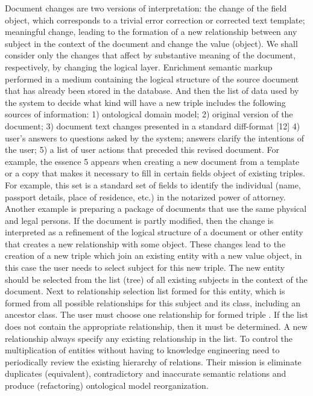 \documentclass[conference]{IEEEtran}
\begin{document}
	Document changes are two versions of interpretation: the change of the field object, which corresponds to a trivial error correction or corrected text template; meaningful change, leading to the formation of a new relationship between any subject in the context of the document and change the value (object). We shall consider only the changes that affect by substantive meaning of the document, respectively, by changing the logical layer.
	Enrichment semantic markup performed in a medium containing the logical structure of the source document that has already been stored in the database. And then the list of data used by the system to decide what kind will have a new triple includes the following sources of information:
1) ontological domain model;
2) original version of the document;
3) document text changes presented in a standard diff-format [12]
4)  user's answers to questions asked by the system; answers clarify the intentions of the user;
5) a list of user actions that preceded this revised document.
	For example, the essence 5 appears when creating a new document from a template or a copy that makes it necessary to fill in certain fields object of existing triples. For example, this set is a standard set of fields to identify the individual (name, passport details, place of residence, etc.) in the notarized power of attorney. Another example is preparing a package of documents that use the same physical and legal persons.
	If the document is partly modified, then the change is interpreted as a refinement of the logical structure of a document or other entity that creates a new relationship with some object. These changes lead to the creation of a new triple which join an existing entity with a new value object, in this case the user needs to select subject for this new triple.
	The new entity should be selected from the list (tree) of all existing subjects in the context of the document. Next to relationship selection list formed for this entity, which is formed from all possible relationships for this subject and its class, including an ancestor class. The user must choose one relationship for formed triple . If the list does not contain the appropriate relationship, then it must be determined. A new relationship always specify any existing relationship in the list. To control the multiplication of entities without having to knowledge engineering need to periodically review the existing hierarchy of relations. Their mission is eliminate duplicates (equivalent), contradictory and inaccurate semantic relations and produce (refactoring) ontological model reorganization.
\end{document}
